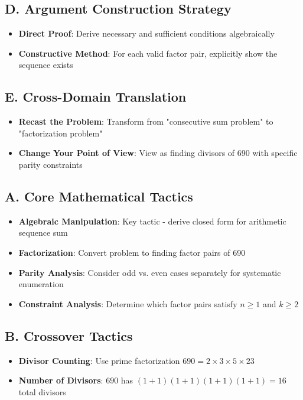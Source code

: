 \documentclass[11pt]{article}
\begin{document}
\begin{strategicbox}
\subsection*{D. Argument Construction Strategy}
\begin{itemize}[leftmargin=*]
    \item \textbf{Direct Proof}: Derive necessary and sufficient conditions algebraically
    \item \textbf{Constructive Method}: For each valid factor pair, explicitly show the sequence exists
\end{itemize}

\subsection*{E. Cross-Domain Translation}
\begin{itemize}[leftmargin=*]
    \item \textbf{Recast the Problem}: Transform from "consecutive sum problem" to "factorization problem"
    \item \textbf{Change Your Point of View}: View as finding divisors of 690 with specific parity constraints
\end{itemize}
\end{strategicbox}

\begin{tacticalbox}
\subsection*{A. Core Mathematical Tactics}
\begin{itemize}[leftmargin=*]
    \item \textbf{Algebraic Manipulation}: Key tactic - derive closed form for arithmetic sequence sum
    \item \textbf{Factorization}: Convert problem to finding factor pairs of 690
    \item \textbf{Parity Analysis}: Consider odd vs. even cases separately for systematic enumeration
    \item \textbf{Constraint Analysis}: Determine which factor pairs satisfy $n \geq 1$ and $k \geq 2$
\end{itemize}

\subsection*{B. Crossover Tactics}
\begin{itemize}[leftmargin=*]
    \item \textbf{Divisor Counting}: Use prime factorization $690 = 2 \times 3 \times 5 \times 23$
    \item \textbf{Number of Divisors}: $690$ has $(1+1)(1+1)(1+1)(1+1) = 16$ total divisors
\end{itemize}
\end{tacticalbox}
\end{document}
